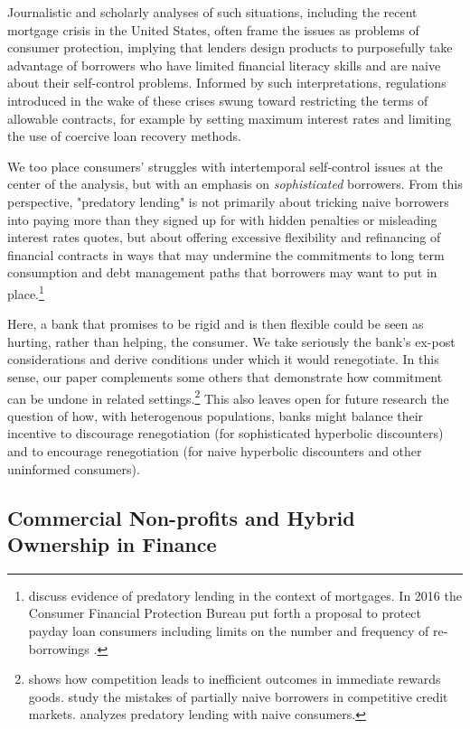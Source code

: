 \documentclass[11pt,english]{article}
\theoremstyle{plain}
\theoremstyle{definition}
\begin{document}
Journalistic and scholarly analyses of such situations, including
the recent mortgage crisis in the United States, often frame
the issues as problems of consumer protection, implying that lenders design products to purposefully take advantage of borrowers
who have limited financial literacy skills and are naive about their
self-control problems. Informed by such interpretations, regulations
introduced in the wake of these crises swung toward restricting
the terms of allowable contracts, for example by setting maximum interest
rates and limiting the use of coercive loan recovery methods.

We too place consumers' struggles with intertemporal self-control issues
at the center of the analysis, but with an emphasis on \emph{sophisticated} borrowers. From this perspective, "predatory lending"
is not primarily about tricking naive borrowers into paying more than
they signed up for with hidden penalties or misleading interest rates
quotes, but about offering excessive flexibility and refinancing of
financial contracts in ways that may undermine the commitments
to long term consumption and debt management paths that borrowers
may want to put in place.\footnote{\citet{bond2009} discuss evidence of predatory lending in the context
of mortgages. In 2016 the Consumer Financial Protection Bureau put
forth a proposal to protect payday loan consumers including limits
on the number and frequency of re-borrowings \citep{cfpb2016}.}

Here, a bank that promises to be rigid and is then flexible could
be seen as hurting, rather than helping, the consumer. We take seriously
the bank's ex-post considerations and derive conditions under which
it would renegotiate.
In this sense, our paper complements some others that demonstrate
how commitment can be undone in related settings.\footnote{\citet{gottlieb2008}
shows how competition leads to inefficient outcomes in immediate rewards
goods. \citet{heidhues2010} study the mistakes of partially naive
borrowers in competitive credit markets.  \citet{mendez2012} analyzes
predatory lending with naive consumers.} This also leaves open for future research the question of how, with heterogenous populations, banks might balance their incentive to discourage renegotiation (for sophisticated hyperbolic discounters) and to encourage renegotiation (for naive hyperbolic discounters and other uninformed consumers).

\subsection{Commercial Non-profits and Hybrid Ownership in Finance}
\end{document}
